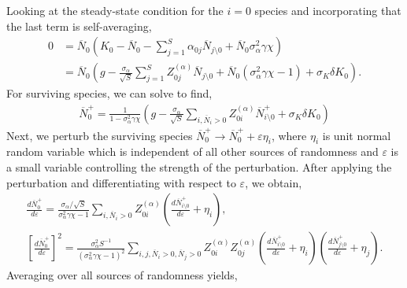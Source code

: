 \documentclass[10pt]{article}
\newcommand{\eval}[1]{\left\langle #1 \right\rangle}
\begin{document}
Looking at the steady-state condition for the $i=0$ species and incorporating that the last term is self-averaging,
\begin{align}
	0
	&=
	\overline N_0
	\left(
		K_0
		-
		\overline N_0
		-
		\sum_{j=1}^S \alpha_{0j}\overline N_{j\setminus0}
		+
		\overline N_0 \sigma_\alpha^2 \gamma \chi
	\right)
	\\
	&=
	\overline N_0
	\left(
		g
		-
		\frac{\sigma_\alpha}{\sqrt{S}}
		\sum_{j=1}^S
		Z_{0j}^{(\alpha)}\overline N_{j\setminus0}
		+
		\overline N_0 (\sigma_\alpha^2 \gamma \chi -1)
		+
		\sigma_K \delta K_0
	\right).
\end{align}
For surviving species, we can solve to find,
\begin{align}
	\overline N_0^+
	=
	\frac{1}{1-\sigma_\alpha^2 \gamma \chi}
	\left(
	g
	-
	\frac{\sigma_\alpha}{\sqrt{S}}
	\sum_{i,\overline N_i>0} Z_{0i}^{(\alpha)}\overline N_{i\setminus 0}^+
	+
	\sigma_K \delta K_0
	\right)
\end{align}
Next, we perturb the surviving species $\overline N_0^+ \to \overline N_0^+ + \varepsilon\eta_i$, where $\eta_i$ is unit normal random variable which is independent of all other sources of randomness and $\varepsilon$ is a small variable controlling the strength of the perturbation.
After applying the perturbation and differentiating with respect to $\varepsilon$, we obtain,
\begin{gather}
	\frac{d\overline N_0^+}{d\varepsilon}
	=
	\frac{\sigma_\alpha/\sqrt{S}}{\sigma_\alpha^2 \gamma \chi-1}
	\sum_{i,\overline N_i>0} Z_{0i}^{(\alpha)}\left(
		\frac{d\overline N_{i\setminus 0}^+}{d\varepsilon}
		+
		\eta_i
	\right),\\
	\left[
		\frac{d\overline N_0^+}{d\varepsilon}
	\right]^2
	=
		\frac{\sigma_\alpha^2 S^{-1}}{\left(\sigma_\alpha^2 \gamma \chi - 1\right)^2}
	\sum_{i,j,\overline N_i>0,\overline N_j>0} 
	Z_{0i}^{(\alpha)}
	Z_{0j}^{(\alpha)}
	\left(
		\frac{d\overline N_{i\setminus 0}^+}{d\varepsilon}
		+
		\eta_i
	\right)
	\left(
		\frac{d\overline N_{j\setminus 0}^+}{d\varepsilon}
		+
		\eta_j
	\right).
\end{gather}
Averaging over all sources of randomness yields,
\end{document}
